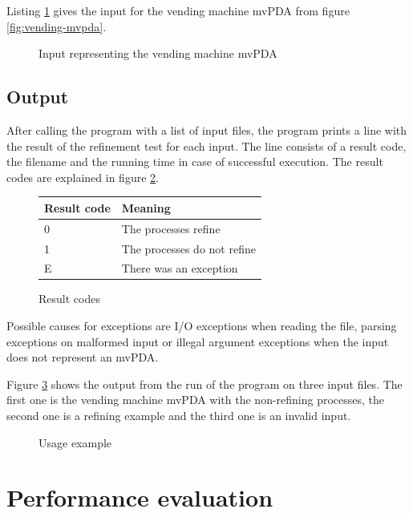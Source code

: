 \begin{example}
Listing \ref{listing:mprs-input} gives the
input for the vending machine mvPDA from figure \ref{fig:vending-mvpda}.
\end{example}

\begin{figure}[ht]

\caption{Input representing the vending machine mvPDA}
\label{listing:mprs-input}
\end{figure}

\subsection{Output}

After calling the program with a list of input files, the program prints
a line with the result of the refinement test for each input.
The line consists of a result code, the filename and the running time
in case of successful execution. The result codes are explained in
figure \ref{fig:result-codes}.

\begin{figure}[ht]
  \centering
  \begin{tabular}{l|l}
    Result code & Meaning \\
    \hline
    {0} & The processes refine \\
    {1} & The processes do not refine  \\
    {E} & There was an exception
  \end{tabular}
  \caption{Result codes}
  \label{fig:result-codes}
\end{figure}

Possible causes for exceptions are I/O exceptions when reading the file,
parsing exceptions on malformed input or illegal argument exceptions
when the input does not represent an mvPDA.

\begin{example}
Figure \ref{listing:usage-output} shows the output from the run
of the program on three input files. The first one is the vending machine mvPDA
with the non-refining processes,
the second one is a refining example
and the third one is an invalid input.
\end{example}

\begin{figure}[ht]

\caption{Usage example}
\label{listing:usage-output}
\end{figure}

\section{Performance evaluation}


